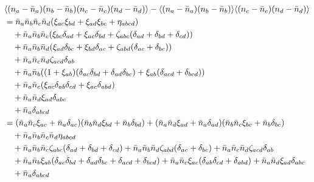 \documentclass{article}
\newcommand{\nbar}{\bar{n}}
\begin{document}
\begin{align}
    & \langle (n_a - \nbar_a) (n_b - \nbar_b) (n_c - \nbar_c) (n_d - \nbar_d) \rangle - \langle (n_a - \nbar_a) (n_b - \nbar_b) \rangle \langle (n_c - \nbar_c) (n_d - \nbar_d) \rangle \notag \\
        &= \nbar_a \nbar_b \nbar_c \nbar_d (\xi_{ac}\xi_{bd} + \xi_{ad}\xi_{bc} + \eta_{abcd}) \notag \\
        &\quad + \nbar_a \nbar_b \nbar_c (\xi_{bc} \delta_{ad} + \xi_{ac} \delta_{bd} + \zeta_{abc}(\delta_{ad} + \delta_{bd} + \delta_{cd})) \notag \\
        &\quad + \nbar_a \nbar_b \nbar_d (\xi_{ad} \delta_{bc} + \xi_{bd} \delta_{ac} + \zeta_{abd}(\delta_{ac} + \delta_{bc})) \notag \\
        &\quad + \nbar_a \nbar_c \nbar_d \zeta_{acd} \delta_{ab} \notag \\
        &\quad + \nbar_a \nbar_b ((1 + \xi_{ab})(\delta_{ac} \delta_{bd} + \delta_{ad} \delta_{bc}) + \xi_{ab} (\delta_{acd} + \delta_{bcd})) \notag \\
        &\quad + \nbar_a \nbar_c (\xi_{ac} \delta_{ab} \delta_{cd} + \xi_{ac} \delta_{abd}) \notag \\
        &\quad + \nbar_a \nbar_d \xi_{ad} \delta_{abc} \notag \\
        &\quad + \nbar_a \delta_{abcd} \\
        &= (\nbar_a \nbar_c \xi_{ac} + \nbar_a \delta_{ac}) (\nbar_b \nbar_d \xi_{bd} + \nbar_b \delta_{bd})
         + (\nbar_a \nbar_d \xi_{ad} + \nbar_a \delta_{ad}) (\nbar_b \nbar_c \xi_{bc} + \nbar_b \delta_{bc}) \notag \\
        &\quad + \nbar_a \nbar_b \nbar_c \nbar_d \eta_{abcd} \notag \\
        &\quad + \nbar_a \nbar_b \nbar_c \zeta_{abc}(\delta_{ad} + \delta_{bd} + \delta_{cd}) + \nbar_a \nbar_b \nbar_d \zeta_{abd} (\delta_{ac} + \delta_{bc}) + \nbar_a \nbar_c \nbar_d \zeta_{acd} \delta_{ab} \notag \\
        &\quad + \nbar_a \nbar_b \xi_{ab} (\delta_{ac} \delta_{bd} + \delta_{ad} \delta_{bc} + \delta_{acd} + \delta_{bcd}) + \nbar_a \nbar_c \xi_{ac} (\delta_{ab} \delta_{cd} + \delta_{abd}) + \nbar_a \nbar_d \xi_{ad} \delta_{abc} \notag \\
        &\quad + \nbar_a \delta_{abcd}
\end{align}
\end{document}
